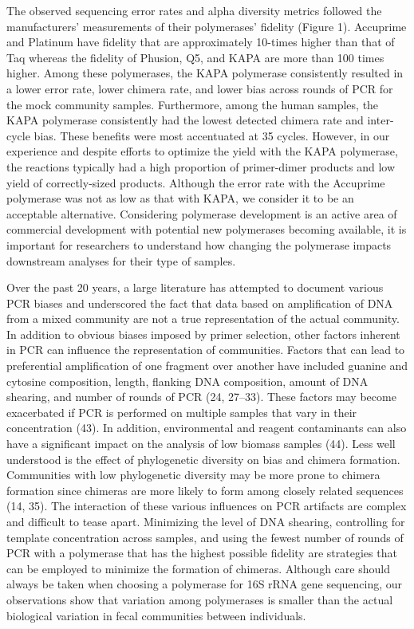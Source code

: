 \documentclass[11pt,]{article}
\begin{document}
The observed sequencing error rates and alpha diversity metrics followed
the manufacturers' measurements of their polymerases' fidelity (Figure
1). Accuprime and Platinum have fidelity that are approximately 10-times
higher than that of Taq whereas the fidelity of Phusion, Q5, and KAPA
are more than 100 times higher. Among these polymerases, the KAPA
polymerase consistently resulted in a lower error rate, lower chimera
rate, and lower bias across rounds of PCR for the mock community
samples. Furthermore, among the human samples, the KAPA polymerase
consistently had the lowest detected chimera rate and inter-cycle bias.
These benefits were most accentuated at 35 cycles. However, in our
experience and despite efforts to optimize the yield with the KAPA
polymerase, the reactions typically had a high proportion of
primer-dimer products and low yield of correctly-sized products.
Although the error rate with the Accuprime polymerase was not as low as
that with KAPA, we consider it to be an acceptable alternative.
Considering polymerase development is an active area of commercial
development with potential new polymerases becoming available, it is
important for researchers to understand how changing the polymerase
impacts downstream analyses for their type of samples.

Over the past 20 years, a large literature has attempted to document
various PCR biases and underscored the fact that data based on
amplification of DNA from a mixed community are not a true
representation of the actual community. In addition to obvious biases
imposed by primer selection, other factors inherent in PCR can influence
the representation of communities. Factors that can lead to preferential
amplification of one fragment over another have included guanine and
cytosine composition, length, flanking DNA composition, amount of DNA
shearing, and number of rounds of PCR (24, 27--33). These factors may
become exacerbated if PCR is performed on multiple samples that vary in
their concentration (43). In addition, environmental and reagent
contaminants can also have a significant impact on the analysis of low
biomass samples (44). Less well understood is the effect of phylogenetic
diversity on bias and chimera formation. Communities with low
phylogenetic diversity may be more prone to chimera formation since
chimeras are more likely to form among closely related sequences (14,
35). The interaction of these various influences on PCR artifacts are
complex and difficult to tease apart. Minimizing the level of DNA
shearing, controlling for template concentration across samples, and
using the fewest number of rounds of PCR with a polymerase that has the
highest possible fidelity are strategies that can be employed to
minimize the formation of chimeras. Although care should always be taken
when choosing a polymerase for 16S rRNA gene sequencing, our
observations show that variation among polymerases is smaller than the
actual biological variation in fecal communities between individuals.
\end{document}
